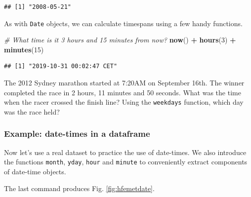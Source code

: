 \documentclass[]{book}
\newenvironment{Shaded}{\begin{snugshade}}{\end{snugshade}}
\newcommand{\CommentTok}[1]{\textcolor[rgb]{0.56,0.35,0.01}{\textit{#1}}}
\newcommand{\DecValTok}[1]{\textcolor[rgb]{0.00,0.00,0.81}{#1}}
\newcommand{\KeywordTok}[1]{\textcolor[rgb]{0.13,0.29,0.53}{\textbf{#1}}}
\newcommand{\NormalTok}[1]{#1}
\newcommand{\OperatorTok}[1]{\textcolor[rgb]{0.81,0.36,0.00}{\textbf{#1}}}
\newcommand{\StringTok}[1]{\textcolor[rgb]{0.31,0.60,0.02}{#1}}
\let\BeginKnitrBlock\begin \let\EndKnitrBlock\end
\begin{document}
\begin{verbatim}
## [1] "2008-05-21"
\end{verbatim}

As with \texttt{Date} objects, we can calculate timespans using a few handy functions.

\begin{Shaded}
\begin{Highlighting}[]
\CommentTok{# What time is it 3 hours and 15 minutes from now?}
\KeywordTok{now}\NormalTok{() }\OperatorTok{+}\StringTok{ }\KeywordTok{hours}\NormalTok{(}\DecValTok{3}\NormalTok{) }\OperatorTok{+}\StringTok{ }\KeywordTok{minutes}\NormalTok{(}\DecValTok{15}\NormalTok{)}
\end{Highlighting}
\end{Shaded}

\begin{verbatim}
## [1] "2019-10-31 00:02:47 CET"
\end{verbatim}

\BeginKnitrBlock{rmdtry}
The 2012 Sydney marathon started at 7:20AM on September 16th. The winner completed the race in 2 hours, 11 minutes and 50 seconds. What was the time when the racer crossed the finish line? Using the \texttt{weekdays} function, which day was the race held?
\EndKnitrBlock{rmdtry}

\hypertarget{example-date-times-in-a-dataframe}{%
\subsubsection{Example: date-times in a dataframe}\label{example-date-times-in-a-dataframe}}

Now let's use a real dataset to practice the use of date-times. We also introduce the functions \texttt{month}, \texttt{yday}, \texttt{hour} and \texttt{minute} to conveniently extract components of date-time objects.

The last command produces Fig. \ref{fig:hfemetdate}.
\end{document}
